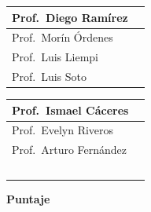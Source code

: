 \documentclass[addpoints,12pt]{exam}
\begin{document}
\vspace{0.15cm}
\noindent
\begin{minipage}{0.49\textwidth}
\begin{tabular}{|l|p{1.1cm}|}
\hline
Prof.\ Diego Ram\'irez & \\ \hline
Prof.\ Mor\'in \'Ordenes & \\ \hline
Prof.\ Luis Liempi & \\ \hline
Prof.\ Luis Soto & \\ \hline
\end{tabular}
\end{minipage}%
\begin{minipage}{0.49\textwidth}
\begin{tabular}{|l|p{1.1cm}|}
\hline
Prof.\ Ismael C\'aceres & \\ \hline
Prof.\ Evelyn Riveros & \\ \hline
Prof.\ Arturo Fern\'andez & \\ \hline
~ & \\ \hline
\end{tabular}
\end{minipage}

\vspace{0.9cm}
\begin{center}
{\large\textbf{Puntaje}}\\[0.2cm]
\gradetable[v][questions]
\end{center}

\newpage
\end{document}
